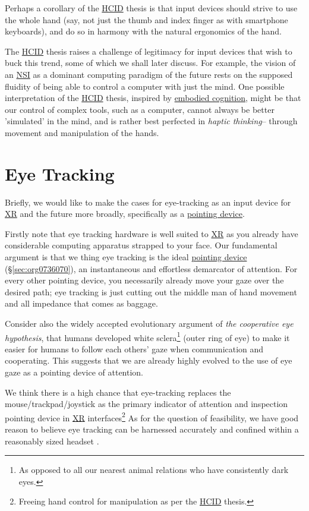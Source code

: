 \documentclass[logo,bsc,singlespacing,parskip]{infthesis}
\begin{document}
Perhaps a corollary of the \hyperref[org0c83164]{HCID} thesis is that input devices should strive to use the whole hand (say, not just the thumb and index finger as with smartphone keyboards), and do so in harmony with the natural ergonomics of the hand.

The \hyperref[org0c83164]{HCID} thesis raises a challenge of legitimacy for input devices that wish to buck this trend, some of which we shall later discuss.
For example, the vision of an \hyperref[orgf403bf3]{NSI} as a dominant computing paradigm of the future rests on the supposed fluidity of being able to control a computer with just the mind.
One possible interpretation of the \hyperref[org0c83164]{HCID} thesis, inspired by \hyperref[orgef09c3f]{embodied cognition}, might be that our control of complex tools, such as a computer, cannot always be better 'simulated' in the mind, and is rather best perfected in \emph{haptic thinking}-- through movement and manipulation of the hands.

\section{Eye Tracking}
\label{sec:orged432e5}
Briefly, we would like to make the cases for eye-tracking as an input device for \hyperref[org39cbd51]{XR} and the future more broadly, specifically as a \hyperref[pointing device]{pointing device}.

Firstly note that eye tracking hardware is well suited to \hyperref[org39cbd51]{XR} as you already have considerable computing apparatus strapped to your face.
Our fundamental argument is that we thing eye tracking is the ideal \hyperref[sec:org0736070]{pointing device} (\S \ref{sec:org0736070}), an instantaneous and effortless demarcator of attention.
For every other pointing device, you necessarily already move your gaze over the desired path; eye tracking is just cutting out the middle man of hand movement and all impedance that comes as baggage.

Consider also the widely accepted evolutionary argument of \emph{the cooperative eye hypothesis}, that humans developed white sclera\footnote{As opposed to all our nearest animal relations who have consistently dark eyes.} (outer ring of eye) to make it easier for humans to follow each others' gaze when communication and cooperating.
This suggests that we are already highly evolved to the use of eye gaze as a pointing device of attention.

We think there is a high chance that eye-tracking replaces the mouse/trackpad/joystick as the primary indicator of attention and inspection pointing device in \hyperref[org39cbd51]{XR} interfaces\footnote{Freeing hand control for manipulation as per the \hyperref[org0c83164]{HCID} thesis.}
As for the question of feasibility, we have good reason to believe eye tracking can be harnessed accurately \autocites{PrecisionGazeMouse}[][]{TobiiGamingNext} and confined within a reasonably sized headset \autocite{VIVEProEye}.
\end{document}
